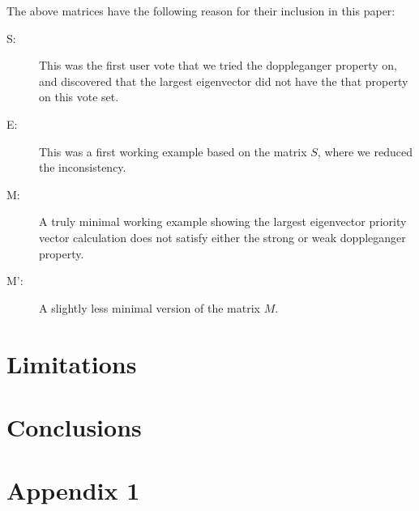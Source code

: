 \documentclass[11pt]{article}
\begin{document}
The above matrices have the following reason for their inclusion in this paper:
\begin{framed}
\begin{description}
	\item [S:] This was the first user vote that we tried the doppleganger property on, and discovered that the largest eigenvector did not have the that property on this vote set.
	\item [E:] This was a first working example based on the matrix $S$, where we reduced the inconsistency.
	\item [M:] A truly minimal working example showing the largest eigenvector priority vector calculation does not satisfy either the strong or weak doppleganger property.
	\item [M':] A slightly less minimal version of the matrix $M$.
\end{description}	
\end{framed}

\section{Limitations}

\section{Conclusions}





 \section{Appendix 1}
 
\end{document}
